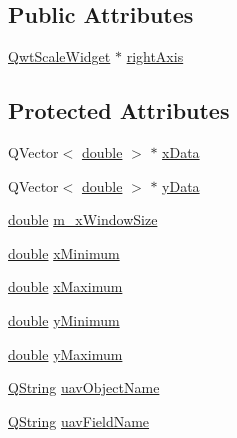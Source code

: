 \subsection*{Public Attributes}
\begin{DoxyCompactItemize}
\item 
\hyperlink{class_qwt_scale_widget}{Qwt\-Scale\-Widget} $\ast$ \hyperlink{group___scope_plugin_gad0b4661f32046ccf0ab49100be76c1b3}{right\-Axis}
\end{DoxyCompactItemize}
\subsection*{Protected Attributes}
\begin{DoxyCompactItemize}
\item 
Q\-Vector$<$ \hyperlink{_super_l_u_support_8h_a8956b2b9f49bf918deed98379d159ca7}{double} $>$ $\ast$ \hyperlink{group___scope_plugin_ga6232b3f635142b1b11f283491a01b719}{x\-Data}
\item 
Q\-Vector$<$ \hyperlink{_super_l_u_support_8h_a8956b2b9f49bf918deed98379d159ca7}{double} $>$ $\ast$ \hyperlink{group___scope_plugin_ga0544d6bcbe24fc0bb460123547821457}{y\-Data}
\item 
\hyperlink{_super_l_u_support_8h_a8956b2b9f49bf918deed98379d159ca7}{double} \hyperlink{group___scope_plugin_gaf008f7f617cf48b623abbd095e483e10}{m\-\_\-x\-Window\-Size}
\item 
\hyperlink{_super_l_u_support_8h_a8956b2b9f49bf918deed98379d159ca7}{double} \hyperlink{group___scope_plugin_ga2115389376ac088ccc03fcb8a2279f8a}{x\-Minimum}
\item 
\hyperlink{_super_l_u_support_8h_a8956b2b9f49bf918deed98379d159ca7}{double} \hyperlink{group___scope_plugin_ga8d380f3d20ca5102bd641b5475238da6}{x\-Maximum}
\item 
\hyperlink{_super_l_u_support_8h_a8956b2b9f49bf918deed98379d159ca7}{double} \hyperlink{group___scope_plugin_gabb9422e4f6ced646443b98b6b4304957}{y\-Minimum}
\item 
\hyperlink{_super_l_u_support_8h_a8956b2b9f49bf918deed98379d159ca7}{double} \hyperlink{group___scope_plugin_gaf9ae404a5b9a749189b4cba112eb5c18}{y\-Maximum}
\item 
\hyperlink{group___u_a_v_objects_plugin_gab9d252f49c333c94a72f97ce3105a32d}{Q\-String} \hyperlink{group___scope_plugin_ga409edd318f86291f5b46a673ff67e7fb}{uav\-Object\-Name}
\item 
\hyperlink{group___u_a_v_objects_plugin_gab9d252f49c333c94a72f97ce3105a32d}{Q\-String} \hyperlink{group___scope_plugin_ga3b137cdb062886f986237f8c9b527c22}{uav\-Field\-Name}

\end{DoxyCompactItemize}
